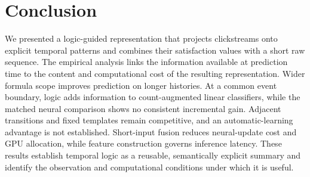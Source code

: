 \documentclass[sigconf,anonymous,nonacm]{acmart}
\newif\ifrevisions
\newenvironment{revblock}{\begingroup\ifrevisions\color{red}\fi}{\endgroup}
\begin{document}
\begin{revblock}
\section{Conclusion}
We presented a logic-guided representation that projects clickstreams onto explicit temporal patterns and combines their satisfaction values with a short raw sequence. The empirical analysis links the information available at prediction time to the content and computational cost of the resulting representation. Wider formula scope improves prediction on longer histories. At a common event boundary, logic adds information to count-augmented linear classifiers, while the matched neural comparison shows no consistent incremental gain. Adjacent transitions and fixed templates remain competitive, and an automatic-learning advantage is not established. Short-input fusion reduces neural-update cost and GPU allocation, while feature construction governs inference latency. These results establish temporal logic as a reusable, semantically explicit summary and identify the observation and computational conditions under which it is useful.
\end{revblock}

\FloatBarrier



\end{document}
